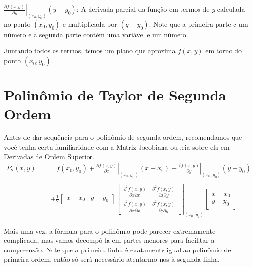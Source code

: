 \documentclass[
  letterpaper,
  DIV=11,
  numbers=noendperiod]{scrreprt}
\begin{document}
\(\left. \frac{\partial f(x,y)}{\partial y} \right |_{(x_0,y_0)} (y-y_0)\):
A derivada parcial da função em termos de \(y\) calculada no ponto
\((x_0, y_0)\) e multiplicada por \((y-y_0)\). Note que a primeira parte
é um número e a segunda parte contém uma variável e um número.

Juntando todos os termos, temos um plano que aproxima \(f(x,y)\) em
torno do ponto \((x_0, y_0)\).

\section{Polinômio de Taylor de Segunda
Ordem}\label{polinuxf4mio-de-taylor-de-segunda-ordem}

Antes de dar sequência para o polinômio de segunda ordem, recomendamos
que você tenha certa familiaridade com a Matriz Jacobiana ou leia sobre
ela em \href{(d-simples.qmd)}{Derivadas de Ordem Superior}. \[
\begin{aligned}
P_2(x,y) = & \phantom{;;} f(x_0, y_0) + 
\left. \frac{\partial f(x,y)}{\partial x} \right |_{(x_0,y_0)} (x-x_0) +
\left. \frac{\partial f(x,y)}{\partial y} \right |_{(x_0,y_0)} (y-y_0) \\ \\
& + \frac{1}{2} \begin{bmatrix} x-x_0 & y-y_0 \end{bmatrix}
\left. \begin{bmatrix} \frac{\partial^2{f(x,y)}}{\partial{x}\partial{x}} & \frac{\partial^2{f(x,y)}}{\partial{x}\partial{y}}\\ 
                \frac{\partial^2{f(x,y)}}{\partial{x}\partial{x}} & \frac{\partial^2{f(x,y)}}{\partial{y}\partial{y}} \end{bmatrix}\right |_{(x_0,y_0)}
\begin{bmatrix} x-x_0 \\ y-y_0 \end{bmatrix}
\end{aligned}
\]

Mais uma vez, a fórmula para o polinômio pode parecer extremamente
complicada, mas vamos decompô-la em partes menores para facilitar a
compreensão. Note que a primeira linha é exatamente igual ao polinômio
de primeira ordem, então só será necessário atentarmo-nos à segunda
linha.
\end{document}
